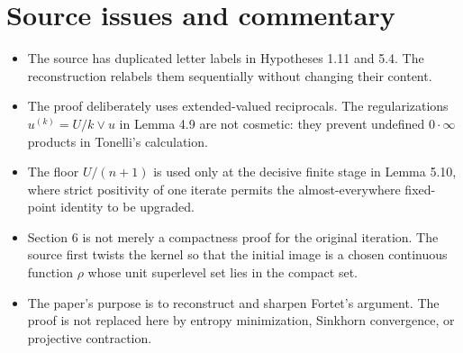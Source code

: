 \section*{Source issues and commentary}
\begin{itemize}[leftmargin=2em]
\item The source has duplicated letter labels in Hypotheses 1.11 and 5.4.  The reconstruction relabels them sequentially without changing their content.
\item The proof deliberately uses extended-valued reciprocals.  The regularizations $u^{(k)}=U/k\vee u$ in Lemma 4.9 are not cosmetic: they prevent undefined $0\cdot\infty$ products in Tonelli's calculation.
\item The floor $U/(n+1)$ is used only at the decisive finite stage in Lemma 5.10, where strict positivity of one iterate permits the almost-everywhere fixed-point identity to be upgraded.
\item Section 6 is not merely a compactness proof for the original iteration.  The source first twists the kernel so that the initial image is a chosen continuous function $\rho$ whose unit superlevel set lies in the compact set.
\item The paper's purpose is to reconstruct and sharpen Fortet's argument.  The proof is not replaced here by entropy minimization, Sinkhorn convergence, or projective contraction.
\end{itemize}



